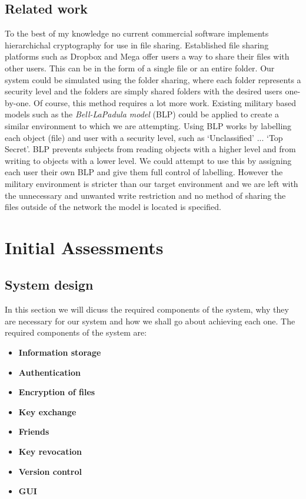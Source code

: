 \documentclass[12pt, titlepage]{article}
\begin{document}
\subsection{Related work}
To the best of my knowledge no current commercial software implements hierarchichal cryptography for use in file sharing.
\newline \indent Established file sharing platforms such as Dropbox and Mega offer users a way to share their files with other users. This can be in the form of a single file or an entire folder. Our system could be simulated using the folder sharing, where each folder represents a security level and the folders are simply shared folders with the desired users one-by-one. Of course, this method requires a lot more work.
\newline \indent Existing military based models such as the \textit{Bell-LaPadula model} (BLP) could be applied to create a similar environment to which we are attempting. Using BLP works by labelling each object (file) and user with a security level, such as `Unclassified' ... `Top Secret'. BLP prevents subjects from reading objects with a higher level and from writing to objects with a lower level. We could attempt to use this by assigning each user their own BLP and give them full control of labelling. However the military environment is stricter than our target environment and we are left with the unnecessary and unwanted write restriction and no method of sharing the files outside of the network the model is located is specified.

\section{Initial Assessments}

\subsection{System design}
In this section we will dicuss the required components of the system, why they are necessary for our system and how we shall go about achieving each one. The required components of the system are:
\begin{itemize}
	\item \textbf{Information storage}
	\item \textbf{Authentication}
	\item \textbf{Encryption of files}
	\item \textbf{Key exchange}
	\item \textbf{Friends}
	\item \textbf{Key revocation}
	\item \textbf{Version control}
	\item \textbf{GUI}
\end{itemize}
\end{document}
